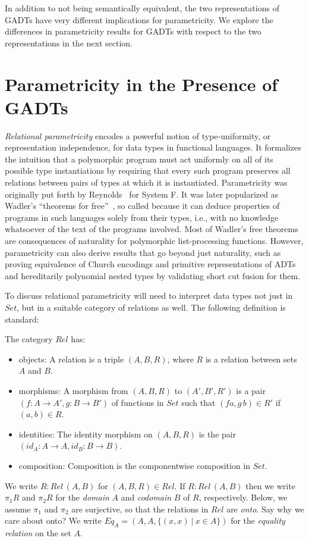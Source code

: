 \documentclass[acmsmall,screen,review,anonymous]{acmart}
\theoremstyle{definition}
\begin{document}
In addition to not being semantically equivalent, the two
representations of GADTs have very different implications for
parametricity. We explore the differences in parametricity results for
GADTs with respect to the two representations in the next section.

\section{Parametricity in the Presence of GADTs}\label{sec:par}

{\em Relational parametricity} encodes a powerful notion of
type-uniformity, or representation independence, for data types in
functional languages. It formalizes the intuition that a polymorphic
program must act uniformly on all of its possible type instantiations
by requiring that every such program preserves all relations between
pairs of types at which it is instantiated. Parametricity was
originally put forth by Reynolds~\cite{rey83} for System F. It was
later popularized as Wadler's ``theorems for free''~\cite{wad89}, so
called because it can deduce properties of programs in such languages
solely from their types, i.e., with no knowledge whatsoever of the
text of the programs involved.  Most of Wadler's free theorems are
consequences of naturality for polymorphic list-processing
functions. However, parametricity can also derive results that go
beyond just naturality, such as proving equivalence of Church
encodings and primitive representations of ADTs and {\color{blue}
  hereditarily polynomial} nested types by validating short cut fusion
for them.

To discuss relational parametricity will need to interpret data types
not just in $\mathit{Set}$, but in a suitable category of relations as
well. The following definition is standard:
\begin{definition}
  The category $\mathit{Rel}$ has:
  \begin{itemize}
\item objects: A relation is a triple $(A,B,R)$, where $R$ is a
  relation between sets $A$ and $B$.
\item morphisms: A morphism from $(A,B,R)$ to $(A',B',R')$ is a pair
  $(f : A \to A',g : B \to B')$ of functions in $\mathit{Set}$ such
  that $(f a,g\,b) \in R'$ if $(a,b) \in R$.
\item identities: The identity morphism on $(A,B,R)$ is the pair
  $(\mathit{id}_A : A \to A, \mathit{id}_B : B \to B)$.
\item composition: Composition is the componentwise composition in
  $\mathit{Set}$. 
\end{itemize}
\end{definition}
\noindent
We write $R : \mathit{Rel}\,(A,B)$ for $(A,B,R) \in \mathit{Rel}$.  If
$R : \mathit{Rel}\,(A,B)$ then we write $\pi_1 R$ and $\pi_2 R$ for
the {\em domain} $A$ and {\em codomain} $B$ of $R$,
respectively. Below, we assume $\pi_1$ and $\pi_2$ are surjective, so
that the relations in $\mathit{Rel}$ are {\em onto}. {\color{blue} Say
  why we care about onto?} We write $\mathit{Eq}_A = (A,A,\{(x,x)~|~ x
\in A\})$ for the {\em equality relation} on the set $A$.
\end{document}
